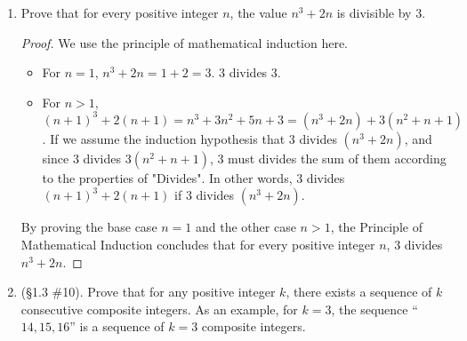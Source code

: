 \documentclass[11pt,a4paper]{article}
\begin{document}
\begin{enumerate}
	\begin{proof} We use the principle of mathematical induction here.\\
		\begin{itemize}
			\item For base case $n=1$, the left side of the equation is $\frac{1-x}{1-x}$, which equals 1. The right side of the equation becomes 1, matches the left side. The equation holds.
			\item For $n>1$, the left side of the equation becomes \[ \frac{1-x^{n+1}}{1-x} = \frac{1-x^{n}\cdot x}{1-x} = \frac{1 - x + x -x^{n}\cdot x}{1-x} = \frac{(1 - x) + x(1 -x^{n})}{1-x} = 1 + \frac{x(1 -x^{n})}{1-x}. \] And the right side of the equation becomes $1 + x + \ldots + x^{n}.$ \\ Having the induction hypothesis, assume $ \frac{1-x^{n}}{1-x} = 1 + x + \ldots + x^{n-1} $, then \[ 1 + \frac{x(1 -x^{n})}{1-x} = 1 + (x \cdot 1+ x \cdot x + \ldots + x \cdot x^{n-1}) =  1 + x + \ldots + x^{n}.\] The equation holds.
		\end{itemize}
		By proving the base case $n=1$ and the other case $n>1$, the Principle of Mathematical Induction concludes that for every positive integer $n$, if $x \neq 1$, then \( \frac{1-x^{n}}{1-x} = 1 + x + \ldots + x^{n-1} . \)
	\end{proof}


	\item Prove that for every positive integer \(n\), the value \(n^{3}+ 2n\) is divisible by \(3\).

	\begin{proof} We use the principle of mathematical induction here.\\
		\begin{itemize}
			\item  For $n=1$, $n^3+2n = 1+2 =3$. 3 divides 3.
			\item For $n>1$, $(n+1)^3 + 2(n+1) = n^3 + 3n^2 + 5n + 3 = (n^3 + 2n) + 3(n^2 + n + 1)$. If we assume the induction hypothesis that 3 divides $(n^3 + 2n)$, and since 3 divides $3(n^2 + n + 1)$, 3 must divides the sum of them according to the properties of "Divides". In other words, 3 divides $(n+1)^3 + 2(n+1)$ if 3 divides $(n^3 + 2n)$.
		\end{itemize}
		By proving the base case $n=1$ and the other case $n>1$, the Principle of Mathematical Induction concludes that for every positive integer $n$, 3 divides $n^3 + 2n$.
	\end{proof}


	\item (\S 1.3 \#10). Prove that for any positive integer \(k\), there exists a sequence of $k$ consecutive composite integers.  As an example, for $k=3$, the sequence ``\(14, 15, 16\)'' is a sequence of \(k=3\) composite integers.


\end{enumerate}
\end{document}
